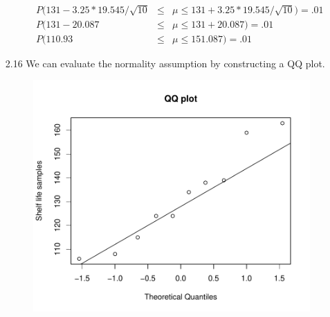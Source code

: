 \documentclass{article}
\begin{document}
\begin{enumerate}
\begin{enumerate}
$$\begin{array}{rcl}
                          P(131 - 3.25*19.545/\sqrt{10} &\le& \mu \le 131 + 3.25*19.545/\sqrt{10}) = .01 \\
                          P(131 - 20.087 &\le& \mu \le 131+ 20.087) = .01 \\
                          P(110.93 &\le& \mu \le 151.087) =.01
        \end{array}$$
    \end{enumerate}
  \item[2.16] We can evaluate the normality assumption by constructing a QQ plot.
        \begin{figure}[h]
          \begin{center}
\includegraphics{Homework1-003}
          \end{center}
        \end{figure}
            

\end{enumerate}
\end{document}
